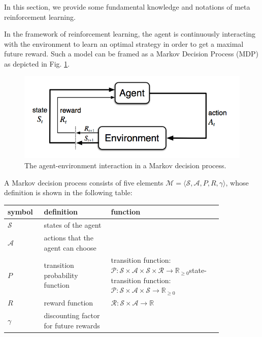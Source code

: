 In this section, we provide some fundamental knowledge and notations of meta reinforcement learning.

\par
In the framework of reinforcement learning, the agent is continuously interacting with the environment to learn an optimal strategy in order to get a maximal future reward. Such a model can be framed as a Markov Decision Process (MDP) as depicted in Fig. \ref{mdp}.

\begin{figure}[H]
	\includegraphics[scale=0.35]{mdp.png}
	\centering
	\caption{The agent-environment interaction in a Markov decision process\cite{n-step-return}.}
	\label{mdp}
\end{figure}

A Markov decision process consists of five elements $\mathcal{M} = \langle \mathcal{S}, \mathcal{A}, P, R, \gamma \rangle$, whose definition is shown in the following table:

\begin{center}
	\begin{tabular}{| p{0.12\linewidth} | p{0.27\linewidth} | p{0.45\linewidth} |}
		\hline
		\textbf{symbol} & \textbf{definition} & \textbf{function} \\
		\hline
		$\mathcal{S}$ & states of the agent &  \\ 
		\hline
		$\mathcal{A}$ & actions that the agent can choose &  \\ 
		\hline 
		$P$ & transition probability function & transition function:\newline $\mathcal{P}: \mathcal{S} \times \mathcal{A} \times \mathcal{S} \times \mathcal{R} \rightarrow \mathbb{R}_{\geq 0}$\newline state-transition function:\newline $\mathcal{P}: \mathcal{S} \times \mathcal{A} \times \mathcal{S} \rightarrow \mathbb{R}_{\geq 0}$\\
		\hline 
		$R$ & reward function & $\mathcal{R}: \mathcal{S} \times \mathcal{A} \rightarrow \mathbb{R}$ \\
		\hline 
		$\gamma$ & discounting factor for future rewards &  \\
		\hline 
	\end{tabular}
\end{center}

